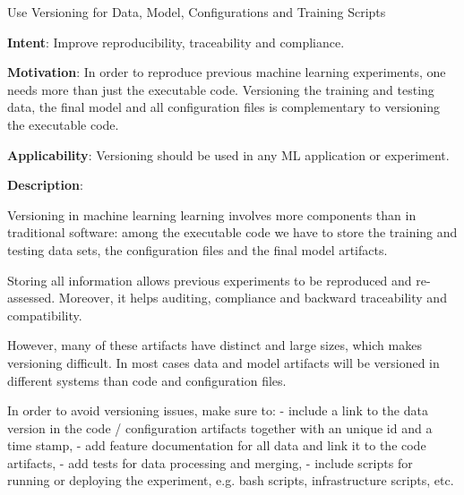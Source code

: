  
  \begin{frame}[plain]{ Use Versioning for Data, Model, Configurations and Training Scripts
 }

  \textbf{Intent}: Improve reproducibility, traceability and compliance. 
 

  \textbf{Motivation}: In order to reproduce previous machine learning experiments, one needs more than just the executable code. Versioning the training and testing data, the final model and all configuration files is complementary to versioning the executable code. 
 

  \textbf{Applicability}: Versioning should be used in any ML application or experiment.
 

  \textbf{Description}: 

Versioning in machine learning learning involves more components than in traditional software: among the executable code we have to store the training and testing data sets, the configuration files and the final model artifacts.


Storing all information allows previous experiments to be reproduced and re-assessed.
Moreover, it helps auditing, compliance and backward traceability and compatibility.


However, many of these artifacts have distinct and large sizes, which makes versioning difficult.
In most cases data and model artifacts  will be versioned in different systems than code and configuration files.


In order to avoid versioning issues, make sure to:
- include a link to the data version in the code / configuration artifacts together with an unique id and a time stamp,
- add feature documentation for all data and link it to the code artifacts,
- add tests for data processing and merging,
- include scripts for running or deploying the experiment, e.g. bash scripts, infrastructure scripts, etc.


 


  \end{frame}

